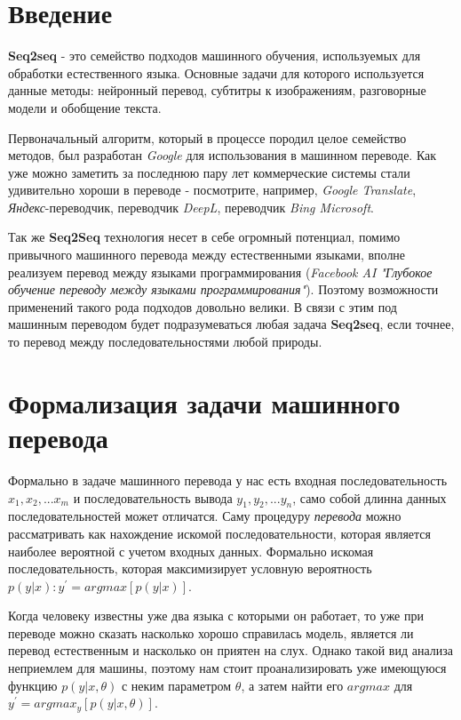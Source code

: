 \documentclass[a4paper,12pt]{article}
\begin{document}
	
	
	
	\section{Введение}
	
	\textbf{Seq2seq} - это семейство подходов машинного обучения, используемых для обработки естественного языка. Основные задачи для которого используется данные методы: нейронный перевод, субтитры к изображениям, разговорные модели и обобщение текста.
	
	Первоначальный алгоритм, который в процессе породил целое семейство методов, был разработан \textit{Google} для использования в машинном переводе. Как уже можно заметить за последнюю пару лет коммерческие системы стали удивительно хороши в  переводе - посмотрите, например, \textit{Google Translate}, \textit{Яндекс}-переводчик, переводчик \textit{DeepL}, переводчик \textit{Bing Microsoft}.
	
	Так же \textbf{Seq2Seq} технология несет в себе огромный потенциал, помимо привычного машинного перевода между естественными языками, вполне реализуем перевод между языками программирования (\textit{Facebook AI "Глубокое обучение переводу между языками программирования"}). Поэтому возможности применений такого рода подходов довольно велики. В связи с этим под машинным переводом будет подразумеваться любая задача \textbf{Seq2seq}, если точнее, то перевод между последовательностями любой природы.
	
	\clearpage
	
	\section{Формализация задачи машинного перевода}
	
	Формально в задаче машинного перевода у нас есть входная последовательность $x_{1}, x_{2}, ... x_{m}$ и последовательность вывода $y_{1}, y_{2}, ... y_{n}$, само собой длинна данных последовательностей может отличатся. Саму процедуру \textit{перевода} можно рассматривать как нахождение искомой последовательности, которая является наиболее вероятной с учетом входных данных. Формально искомая последовательность, которая максимизирует условную вероятность $p(y|x): y^{'} = argmax[p(y|x)]$.
	
	Когда человеку известны уже два языка с которыми он работает, то уже при переводе можно сказать насколько хорошо справилась модель, является ли перевод естественным и насколько он приятен на слух. Однако такой вид анализа неприемлем для машины, поэтому нам стоит проанализировать уже имеющуюся функцию $p(y|x,\theta)$ с неким параметром $\theta$, а затем найти его $argmax$ для $y^{'} = argmax_{y}[p(y|x, \theta)]$.
	
\end{document}
